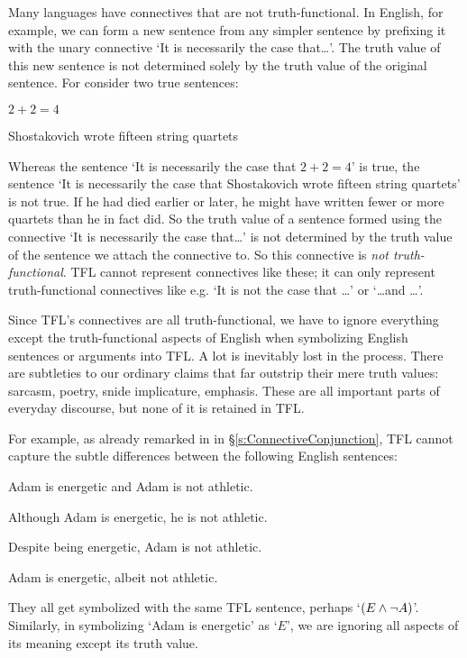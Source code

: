 Many languages have connectives that are not truth-functional. In English, for example, we can form a new sentence from any simpler sentence by prefixing it with the unary connective `It is necessarily the case that\ldots'. The truth value of this new sentence is not determined solely by the truth value of the original sentence. For consider two true sentences:
	\begin{earg}
		\item $2 + 2 = 4$
		\item Shostakovich wrote fifteen string quartets
	\end{earg}
Whereas the sentence `It is necessarily the case that $2 + 2 = 4$' is true, the sentence `It is necessarily the case that Shostakovich wrote fifteen string quartets' is not true. If he had died earlier or later, he might have written fewer or more quartets than he in fact did. So the truth value of a sentence formed using the connective `It is necessarily the case that\ldots' is not determined by the truth value of the sentence we attach the connective to.  So this connective is \emph{not truth-functional}.  TFL cannot represent connectives like these; it can only represent truth-functional connectives like e.g. `It is not the case that \ldots' or `\ldots and \ldots'.


Since TFL's connectives are all truth-functional, we have to ignore everything except the truth-functional aspects of English when symbolizing English sentences or arguments into TFL.  A lot is inevitably lost in the process.  There are subtleties to our ordinary claims that far outstrip their mere truth values: sarcasm, poetry, snide implicature, emphasis.  These are all important parts of everyday discourse, but none of it is retained in TFL.

For example, as already remarked in in \S\ref{s:ConnectiveConjunction}, TFL cannot capture the subtle differences between the following English sentences:
	\begin{earg}
		\item Adam is energetic and Adam is not athletic.
		\item Although Adam is energetic, he is not athletic.
		\item Despite being energetic, Adam is not athletic.
		\item Adam is energetic, albeit not athletic.
	\end{earg}
They all get symbolized with the same TFL sentence, perhaps `$(E \wedge \neg A)$'.  Similarly, in symbolizing `Adam is energetic' as `$E$', we are ignoring all aspects of its meaning except its truth value.

